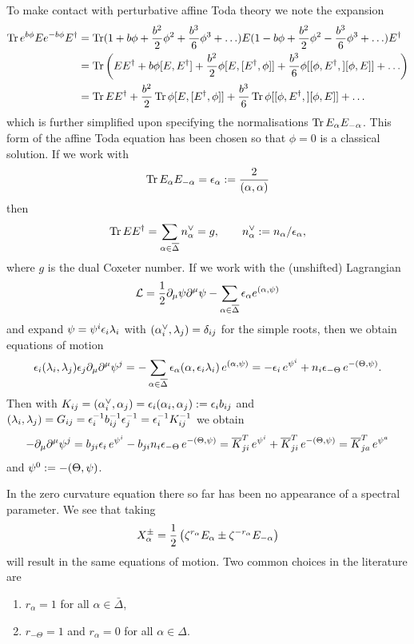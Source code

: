 \documentclass{article}
\begin{document}
To make contact with perturbative affine Toda theory we note the expansion
\begin{align*}
\tr e^{b\phi}E  e^{-b\phi} E\sp\dagger&=\tr
(1+b\phi+\frac{b^2}{2}\phi^2+\frac{b^3}{6}\phi^3+\ldots) E
(1-b\phi+\frac{b^2}{2}\phi^2-\frac{b^3}{6}\phi^3+\ldots) 
E\sp\dagger\\
&=\tr \left(E E\sp\dagger+b\phi[E,E\sp\dagger]+\frac{b^2}{2}\phi[ E,[ E\sp\dagger, \phi]]+
\frac{b^3}{6}\phi[ [\phi, E\sp\dagger,] [\phi,E]]
+ \ldots
\right)\\
&= \tr E E\sp\dagger+\frac{b^2}{2}\tr \phi[ E,[ E\sp\dagger, \phi]]+ \frac{b^3}{6}\tr \phi[ [\phi, E\sp\dagger,] [\phi,E]]+\ldots
\end{align*}
which is further simplified upon specifying the normalisations $ \tr E_\alpha E_{-\alpha}$. This form of the
affine Toda equation has been chosen so that $\phi=0$ is a classical solution. If we work with
$$\tr E_\alpha E_{-\alpha}=\epsilon_\alpha:=\frac2{(\alpha,\alpha)}
$$
then
$$ \tr E E\sp\dagger=\sum_{\alpha\in\bar\Delta}n_\alpha\sp\vee =g,\qquad  n_\alpha\sp\vee :=
n_\alpha/\epsilon_\alpha,$$
where $g$ is the dual Coxeter number. If we work with the (unshifted) Lagrangian
$$
\mathcal{L}= \frac12 \partial_\mu\psi \partial\sp\mu\psi -
\sum_{\alpha\in\bar\Delta}\epsilon_\alpha e\sp{(\alpha,\psi)}
$$
and expand $\psi=\psi\sp{i}\epsilon_i\lambda_i$ with $(\alpha_i\sp\vee,\lambda_j)=\delta_{ij}$ for the simple roots, then we obtain equations of motion
$$\epsilon_i(\lambda_i,\lambda_j)\epsilon_j \partial_\mu\partial\sp\mu\psi\sp{j}=-
\sum_{\alpha\in\bar\Delta}\epsilon_\alpha (\alpha, \epsilon_i\lambda_i)\, e\sp{(\alpha,\psi)}
= -\epsilon_i\, e\sp{\psi\sp{i}}+n_i \epsilon_{-\Theta }\,e\sp{-(\Theta,\psi)}.
$$
Then with $K_{ij}=(\alpha_i\sp{\vee},\alpha_j)=\epsilon_i (\alpha_i,\alpha_j):=\epsilon_i b_{ij}$ and
$(\lambda_i,\lambda_j)=G_{ij}=\epsilon_i\sp{-1}b_{ij}\sp{-1}\epsilon_j\sp{-1}=\epsilon_i\sp{-1}K_{ij}\sp{-1}$ we obtain
$$-\partial_\mu\partial\sp\mu\psi\sp{j}=b_{ji}\epsilon_i\, e\sp{\psi\sp{i}}-b_{ji}n_i \epsilon_{-\Theta }\,e\sp{-(\Theta,\psi)}
={\bar K}_{ji}\sp{T}\, e\sp{\psi\sp{i}}+{\bar K}_{ji}\sp{T}\, e\sp{-(\Theta,\psi)}
={\bar K}_{ja}\sp{T}\, e\sp{\psi\sp{a}}
$$
and $\psi\sp0:=-(\Theta,\psi)$.


In the zero curvature equation there so far has been no appearance of a spectral parameter. We see that
taking
$$X_\alpha\sp\pm = \frac12\left( \zeta\sp{r_\alpha} E_\alpha \pm \zeta\sp{-r_\alpha} E_{-\alpha}\right)$$
will result in the same equations of motion. Two common choices in the literature are
\begin{enumerate}
	\item $r_\alpha=1$ for all $\alpha\in\bar\Delta$,
	\item $r_{-\Theta}=1$ and $r_\alpha=0$ for all $\alpha\in\Delta$.
\end{enumerate}
\end{document}
